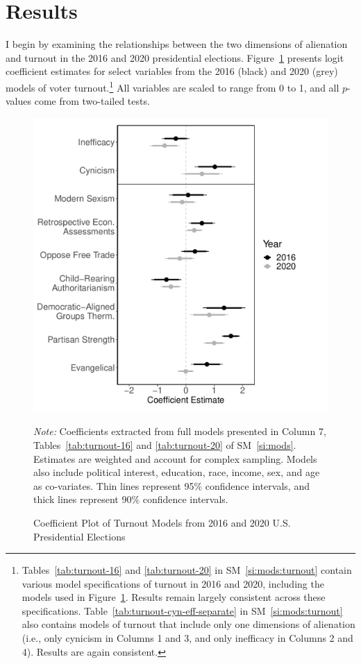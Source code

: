 \documentclass[12pt]{article}
\begin{document}
\section*{Results}\label{sec:results}

I begin by examining the relationships between the two dimensions of alienation and turnout in the 2016 and 2020 presidential elections. Figure~\ref{fig:coefplot-turnout-16-20} presents logit coefficient estimates for select variables from the 2016 (black) and 2020 (grey) models of voter turnout.\footnote{Tables~\ref{tab:turnout-16} and \ref{tab:turnout-20} in SM~\ref{si:mods:turnout} contain various model specifications of turnout in 2016 and 2020, including the models used in Figure~\ref{fig:coefplot-turnout-16-20}. Results remain largely consistent across these specifications. Table~\ref{tab:turnout-cyn-eff-separate} in SM~\ref{si:mods:turnout} also contains models of turnout that include only one dimensions of alienation (i.e., only cynicism in Columns 1 and 3, and only inefficacy in Columns 2 and 4). Results are again consistent.} All variables are scaled to range from 0 to 1, and all $p$-values come from two-tailed tests.

\begin{figure}[t!]
	\centering
	\includegraphics[width=0.65\linewidth]{Figures/Turnout-2016-2020-CoefPlot.pdf}
	\caption{Coefficient Plot of Turnout Models from 2016 and 2020 U.S. Presidential Elections}\label{fig:coefplot-turnout-16-20}
	\vspace{-2em}
	{\singlespacing\scriptsize \textit{Note:} Coefficients extracted from full models presented in Column 7,  Tables~\ref{tab:turnout-16} and \ref{tab:turnout-20} of SM~\ref{si:mods}. Estimates are weighted and account for complex sampling. Models also include political interest, education, race, income, sex, and age as co-variates. Thin lines represent 95\% confidence intervals, and thick lines represent 90\% confidence intervals.\par}
\end{figure}
\end{document}
